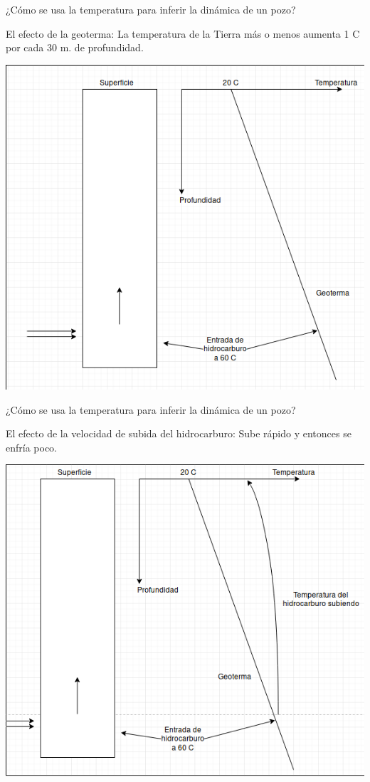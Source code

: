 \documentclass[presentation]{beamer}
\begin{document}
\begin{frame}{¿Cómo se usa la temperatura para inferir la dinámica de un pozo?}
	\begin{block}{El efecto de la geoterma:}
		La temperatura de la Tierra más o menos aumenta 1 C por cada 30 m. de profundidad.
\end{block} 
	\includegraphics[height=.6\textheight]{./geoterma.png}
\end{frame}

\begin{frame}{¿Cómo se usa la temperatura para inferir la dinámica de un pozo?}
	\begin{block}{El efecto de la velocidad de subida del hidrocarburo:}
	Sube rápido y entonces se enfría poco.
\end{block} 
\includegraphics[height=.7\textheight]{./subiendo.png}
\end{frame}
\end{document}
